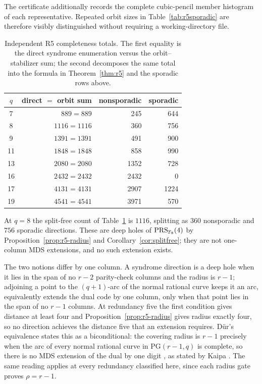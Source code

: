 The certificate additionally records the complete cubic-pencil member
histogram of each representative.  Repeated orbit sizes in
Table~\ref{tab:r5sporadic} are therefore visibly distinguished without
requiring a working-directory file.

\begin{table}[H]
\centering
\small
\caption{Independent R5 completeness totals.  The first equality is
the direct syndrome enumeration versus the orbit--stabilizer sum; the
second decomposes the same total into the formula in
Theorem~\ref{thm:r5} and the sporadic rows above.}
\label{tab:r5-sanity}
\begin{tabular}{crrr}
\toprule
$q$ & direct $=$ orbit sum & nonsporadic & sporadic\\
\midrule
7  & $889=889$   & 245  & 644\\
8  & $1116=1116$ & 360  & 756\\
9  & $1391=1391$ & 491  & 900\\
11 & $1848=1848$ & 858  & 990\\
13 & $2080=2080$ & 1352 & 728\\
16 & $2432=2432$ & 2432 & 0\\
17 & $4131=4131$ & 2907 & 1224\\
19 & $4541=4541$ & 3971 & 570\\
\bottomrule
\end{tabular}
\end{table}

\begin{remark}
\label{rem:q8-no-extension}
At \(q=8\) the split-free count of Table~\ref{tab:r5-sanity} is
\(1116\), splitting as \(360\) nonsporadic and \(756\) sporadic
directions.  These are deep holes of \(\operatorname{PRS}_{\mathbb F_8}(4)\) by
Proposition~\ref{prop:r5-radius} and
Corollary~\ref{cor:splitfree}; they are not one-column MDS extensions,
and no such extension exists.

The two notions differ by one column.  A syndrome direction is a deep
hole when it lies in the span of no \(r-2\) parity-check columns and
the radius is \(r-1\); adjoining a point to the \((q+1)\)-arc of the
normal rational curve keeps it an arc, equivalently extends the dual
code by one column, only when that point lies in the span of no
\(r-1\) columns.  At redundancy five the first condition gives distance
at least four and Proposition~\ref{prop:r5-radius} gives radius exactly
four, so no direction achieves the distance five that an extension
requires.  D\"ur's equivalence states this as a biconditional: the
covering radius is \(r-1\) precisely when the arc of every normal
rational curve in \(\mathrm{PG}(r-1,q)\) is complete, so there is no MDS
extension of the dual by one digit
\cite{Dur1994}, as stated by Kaipa \cite[Sec.~IV]{Kaipa2017}.  The same
reading applies at every redundancy classified here, since each radius
gate proves \(\rho=r-1\).

\end{remark}
